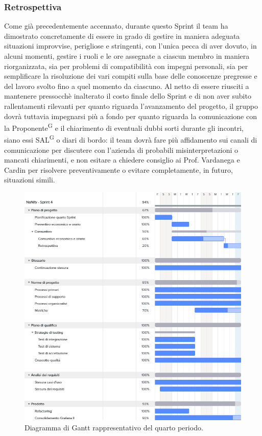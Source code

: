 \documentclass[8pt]{article}
\newcommand{\glossterm}[1]{#1\textsuperscript{G}} %
\begin{document}
\subsubsection{Retrospettiva}
Come già precedentemente accennato, durante questo Sprint il team ha dimostrato concretamente di essere in grado di gestire in maniera adeguata
situazioni improvvise, perigliose e stringenti, con l'unica pecca di aver dovuto, in alcuni momenti, gestire i ruoli e le ore assegnate
a ciascun membro in maniera riorganizzata, sia per problemi di compatibilità con impegni personali, sia per semplificare la risoluzione 
dei vari compiti sulla base delle conoscenze pregresse e del lavoro svolto fino a quel momento da ciascuno. Al netto di essere riusciti a
mantenere pressocchè inalterato il costo finale dello Sprint e di non aver subito rallentamenti rilevanti per quanto riguarda l'avanzamento
del progetto, il gruppo dovrà tuttavia impegnarsi più a fondo per quanto riguarda la comunicazione con la \glossterm{Proponente} e il chiarimento
di eventuali dubbi sorti durante gli incontri, siano essi \glossterm{SAL} o diari di bordo: il team dovrà fare più affidamento sui canali di comunicazione
per discutere con l'azienda di probabili misinterpretazioni o mancati chiarimenti, e non esitare a chiedere consiglio ai Prof. Vardanega e Cardin
per risolvere preventivamente o evitare completamente, in futuro, situazioni simili. 
\begin{figure}[h!]
    \centering
    \includegraphics[width=13cm]{./images_pdp/gantt4.png}
    \caption{Diagramma di Gantt rappresentativo del quarto periodo.}
\end{figure}
\clearpage
\end{document}
